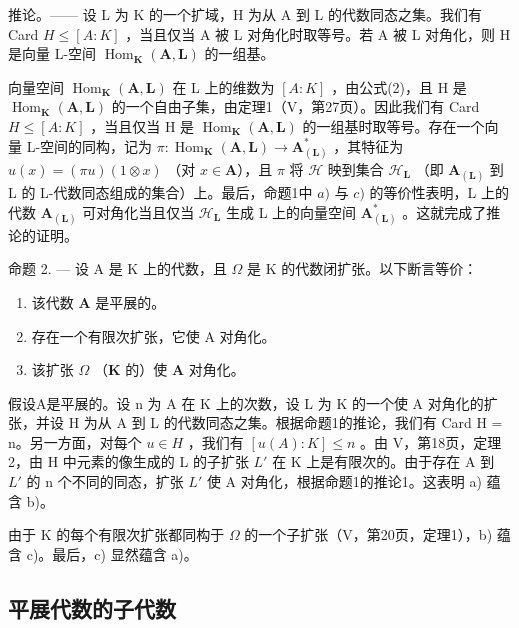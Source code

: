 推论。—— 设 L 为 K 的一个扩域，H 为从 A 到 L 的代数同态之集。我们有 Card \(H \leq [A:K]\) ，当且仅当 A 被 L 对角化时取等号。若 A 被 L 对角化，则 H 是向量 L-空间 \(\operatorname{Hom}_{\mathbf{K}}(\mathbf{A},\mathbf{L})\) 的一组基。

向量空间 \(\operatorname{Hom}_{\mathbf{K}}(\mathbf{A},\mathbf{L})\) 在 L 上的维数为 \([A:K]\) ，由公式(2)，且 H 是 \(\operatorname{Hom}_{\mathbf{K}}(\mathbf{A},\mathbf{L})\) 的一个自由子集，由定理1（V，第27页）。因此我们有 Card \(H \leqslant [A:K]\) ，当且仅当 H 是 \(\operatorname{Hom}_{\mathbf{K}}(\mathbf{A},\mathbf{L})\) 的一组基时取等号。存在一个向量 L-空间的同构，记为 \(\pi: \operatorname{Hom}_{\mathbf{K}}(\mathbf{A}, \mathbf{L}) \to \mathbf{A}_{(\mathbf{L})}^{*}\) ，其特征为 \(u(x) = (\pi u)(1 \otimes x)\) （对 \(x \in \mathbf{A}\)），且 \(\pi\) 将 \(\mathcal{H}\) 映到集合 \(\mathcal{H}_{\mathbf{L}}\) （即 \(\mathbf{A}_{(\mathbf{L})}\) 到 L 的 L-代数同态组成的集合）上。最后，命题1中 \(a)\) 与 \(c)\) 的等价性表明，L 上的代数 \(\mathbf{A}_{(\mathbf{L})}\) 可对角化当且仅当 \(\mathcal{H}_{\mathbf{L}}\) 生成 L 上的向量空间 \(\mathbf{A}_{(\mathbf{L})}^{*}\) 。这就完成了推论的证明。

命题 2. --- 设 A 是 K 上的代数，且 \(\Omega\) 是 K 的代数闭扩张。以下断言等价：

\begin{enumerate}
\def\labelenumi{\alph{enumi})}
\item
  该代数 \(\mathbf{A}\) 是平展的。
\item
  存在一个有限次扩张，它使 A 对角化。
\item
  该扩张 \(\Omega\) （\(\mathbf{K}\) 的）使 \(\mathbf{A}\) 对角化。
\end{enumerate}

假设A是平展的。设 n 为 A 在 K 上的次数，设 L 为 K 的一个使 A 对角化的扩张，并设 H 为从 A 到 L 的代数同态之集。根据命题1的推论，我们有 Card H = n。另一方面，对每个 \(u \in H\) ，我们有 \([u(A):K] \leqslant n\) 。由 V，第18页，定理2，由 H 中元素的像生成的 L 的子扩张 \(L'\) 在 K 上是有限次的。由于存在 A 到 \(L'\) 的 n 个不同的同态，扩张 \(L'\) 使 A 对角化，根据命题1的推论1。这表明 a) 蕴含 b)。

由于 K 的每个有限次扩张都同构于 \(\Omega\) 的一个子扩张（V，第20页，定理1），b) 蕴含 c)。最后，c) 显然蕴含 a)。

\subsection{平展代数的子代数}

